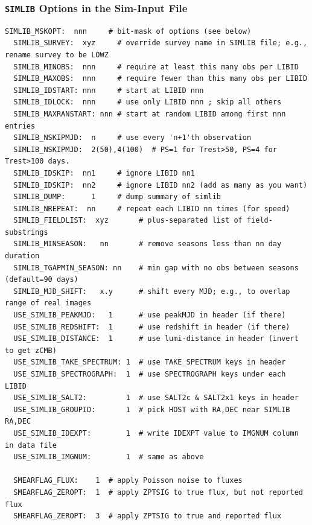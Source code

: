 \documentclass[12pt]{article}
\newcommand{\simlib}{{\tt SIMLIB}}
\begin{document}
{%
\clearpage
\subsubsection{{\simlib} Options in the Sim-Input File}
\label{sssec:simlib_options}

\begin{Verbatim}[frame=single]
  SIMLIB_MSKOPT:  nnn     # bit-mask of options (see below)
  SIMLIB_SURVEY:  xyz     # override survey name in SIMLIB file; e.g., rename survey to be LOWZ
  SIMLIB_MINOBS:  nnn     # require at least this many obs per LIBID
  SIMLIB_MAXOBS:  nnn     # require fewer than this many obs per LIBID
  SIMLIB_IDSTART: nnn     # start at LIBID nnn
  SIMLIB_IDLOCK:  nnn     # use only LIBID nnn ; skip all others
  SIMLIB_MAXRANSTART: nnn # start at random LIBID among first nnn entries
  SIMLIB_NSKIPMJD:  n     # use every 'n+1'th observation
  SIMLIB_NSKIPMJD:  2(50),4(100)  # PS=1 for Trest>50, PS=4 for Trest>100 days.
  SIMLIB_IDSKIP:  nn1     # ignore LIBID nn1
  SIMLIB_IDSKIP:  nn2     # ignore LIBID nn2 (add as many as you want)  
  SIMLIB_DUMP:      1     # dump summary of simlib 
  SIMLIB_NREPEAT:  nn     # repeat each LIBID nn times (for speed)
  SIMLIB_FIELDLIST:  xyz       # plus-separated list of field-substrings
  SIMLIB_MINSEASON:   nn       # remove seasons less than nn day duration
  SIMLIB_TGAPMIN_SEASON: nn    # min gap with no obs between seasons (default=90 days)
  SIMLIB_MJD_SHIFT:   x.y      # shift every MJD; e.g., to overlap range of real images
  USE_SIMLIB_PEAKMJD:   1      # use peakMJD in header (if there)
  USE_SIMLIB_REDSHIFT:  1      # use redshift in header (if there)
  USE_SIMLIB_DISTANCE:  1      # use lumi-distance in header (invert to get zCMB)
  USE_SIMLIB_TAKE_SPECTRUM: 1  # use TAKE_SPECTRUM keys in header 
  USE_SIMLIB_SPECTROGRAPH:  1  # use SPECTROGRAPH keys under each LIBID
  USE_SIMLIB_SALT2:         1  # use SALT2c & SALT2x1 keys in header
  USE_SIMLIB_GROUPID:       1  # pick HOST with RA,DEC near SIMLIB RA,DEC
  USE_SIMLIB_IDEXPT:        1  # write IDEXPT value to IMGNUM column in data file
  USE_SIMLIB_IMGNUM:        1  # same as above 

  SMEARFLAG_FLUX:    1  # apply Poisson noise to fluxes
  SMEARFLAG_ZEROPT:  1  # apply ZPTSIG to true flux, but not reported flux
  SMEARFLAG_ZEROPT:  3  # apply ZPTSIG to true and reported flux
\end{Verbatim}

}
\end{document}
